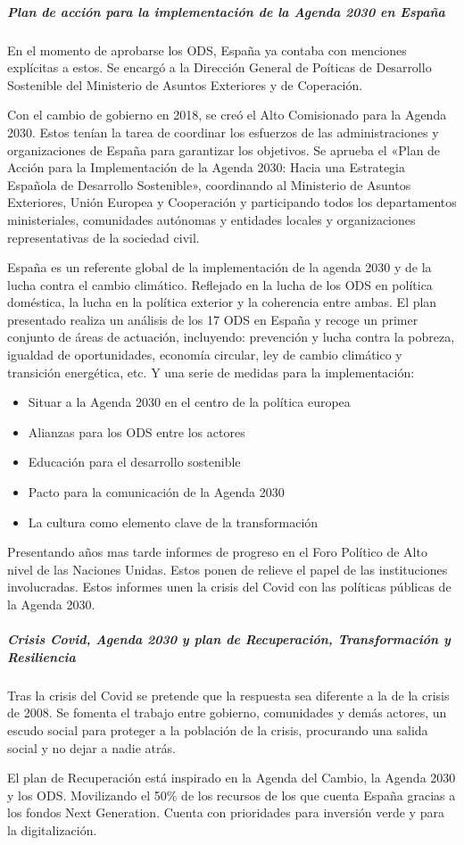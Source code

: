             \subparagraph{Plan de acción para la implementación de la Agenda 2030 en España}
                En el momento de aprobarse los ODS, España ya contaba con menciones explícitas a estos. Se encargó a la Dirección General de Poíticas de Desarrollo Sostenible del Ministerio de Asuntos Exteriores y de Coperación.

                Con el cambio de gobierno en 2018, se creó el Alto Comisionado para la Agenda 2030. Estos tenían la tarea de coordinar los esfuerzos de las administraciones y organizaciones de España para garantizar los objetivos. Se aprueba el «Plan de Acción para la Implementación de la Agenda 2030: Hacia una Estrategia Española de Desarrollo Sostenible», coordinando al Ministerio de Asuntos Exteriores, Unión Europea y Cooperación y participando todos los departamentos ministeriales, comunidades autónomas y entidades locales y organizaciones representativas de la sociedad civil.

                España es un referente global de la implementación de la agenda 2030 y de la lucha contra el cambio climático. Reflejado en la lucha de los ODS en política doméstica, la lucha en la política exterior y la coherencia entre ambas. El plan presentado realiza un análisis de los 17 ODS en España y recoge un primer conjunto de áreas de actuación, incluyendo: prevención y lucha contra la pobreza, igualdad de oportunidades, economía circular, ley de cambio climático y transición energética, etc. Y una serie de medidas para la implementación:
                \begin{itemize}
                    \item Situar a la Agenda 2030 en el centro de la política europea
                    \item Alianzas para los ODS entre los actores
                    \item Educación para el desarrollo sostenible
                    \item Pacto para la comunicación de la Agenda 2030
                    \item La cultura como elemento clave de la transformación
                \end{itemize}

                Presentando años mas tarde informes de progreso en el Foro Político de Alto nivel de las Naciones Unidas. Estos ponen de relieve el papel de las instituciones involucradas. Estos informes unen la crisis del Covid con las políticas públicas de la Agenda 2030.

            \subparagraph{Crisis Covid, Agenda 2030 y plan de Recuperación, Transformación y Resiliencia}
                Tras la crisis del Covid se pretende que la respuesta sea diferente a la de la crisis de 2008. Se fomenta el trabajo entre gobierno, comunidades y demás actores, un escudo social para proteger a la población de la crisis, procurando una salida social y no dejar a nadie atrás.

                El plan de Recuperación está inspirado en la Agenda del Cambio, la Agenda 2030 y los ODS. Movilizando el 50\% de los recursos de los que cuenta España gracias a los fondos Next Generation. Cuenta con prioridades para inversión verde y para la digitalización.